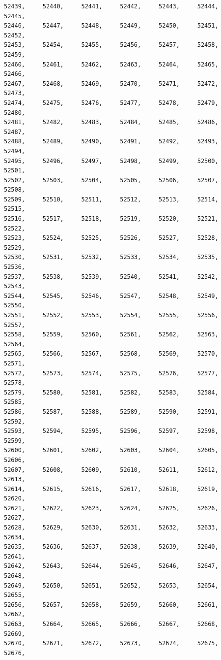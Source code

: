 \documentclass[a4paper,11pt]{report}
\begin{document}
\begin{verbatim}
52439,     52440,     52441,     52442,     52443,     52444,     52445,     
52446,     52447,     52448,     52449,     52450,     52451,     52452,     
52453,     52454,     52455,     52456,     52457,     52458,     52459,     
52460,     52461,     52462,     52463,     52464,     52465,     52466,     
52467,     52468,     52469,     52470,     52471,     52472,     52473,     
52474,     52475,     52476,     52477,     52478,     52479,     52480,     
52481,     52482,     52483,     52484,     52485,     52486,     52487,     
52488,     52489,     52490,     52491,     52492,     52493,     52494,     
52495,     52496,     52497,     52498,     52499,     52500,     52501,     
52502,     52503,     52504,     52505,     52506,     52507,     52508,     
52509,     52510,     52511,     52512,     52513,     52514,     52515,     
52516,     52517,     52518,     52519,     52520,     52521,     52522,     
52523,     52524,     52525,     52526,     52527,     52528,     52529,     
52530,     52531,     52532,     52533,     52534,     52535,     52536,     
52537,     52538,     52539,     52540,     52541,     52542,     52543,     
52544,     52545,     52546,     52547,     52548,     52549,     52550,     
52551,     52552,     52553,     52554,     52555,     52556,     52557,     
52558,     52559,     52560,     52561,     52562,     52563,     52564,     
52565,     52566,     52567,     52568,     52569,     52570,     52571,     
52572,     52573,     52574,     52575,     52576,     52577,     52578,     
52579,     52580,     52581,     52582,     52583,     52584,     52585,     
52586,     52587,     52588,     52589,     52590,     52591,     52592,     
52593,     52594,     52595,     52596,     52597,     52598,     52599,     
52600,     52601,     52602,     52603,     52604,     52605,     52606,     
52607,     52608,     52609,     52610,     52611,     52612,     52613,     
52614,     52615,     52616,     52617,     52618,     52619,     52620,     
52621,     52622,     52623,     52624,     52625,     52626,     52627,     
52628,     52629,     52630,     52631,     52632,     52633,     52634,     
52635,     52636,     52637,     52638,     52639,     52640,     52641,     
52642,     52643,     52644,     52645,     52646,     52647,     52648,     
52649,     52650,     52651,     52652,     52653,     52654,     52655,     
52656,     52657,     52658,     52659,     52660,     52661,     52662,     
52663,     52664,     52665,     52666,     52667,     52668,     52669,     
52670,     52671,     52672,     52673,     52674,     52675,     52676,     

\end{verbatim}
\end{document}

